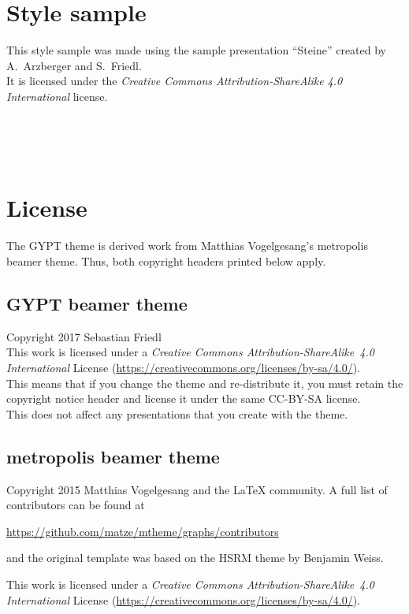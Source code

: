 \documentclass[12pt,a4paper]{scrartcl}
\begin{document}
	\section{Style sample}
	This style sample was made using the sample presentation \enquote{Steine} created by A.~Arzberger and S.~Friedl. \\
	It is licensed under the \textit{Creative Commons Attribution-ShareAlike 4.0 International} license.
	\begin{center}
		  \\
		  \\
		  \\
		 
	\end{center}

	
	\section{License}
	The GYPT theme is derived work from Matthias Vogelgesang's metropolis beamer theme. Thus, both copyright headers printed below apply.
	
	\subsection*{GYPT beamer theme}
	Copyright 2017 Sebastian Friedl \\
	This work is licensed under a \textit{Creative Commons Attribution-ShareAlike~4.0 International} License (\url{https://creativecommons.org/licenses/by-sa/4.0/}). \\
	This means that if you change the theme and re-distribute it, you must retain the copyright notice header and license it under the same CC-BY-SA license. \\
	This does not affect any presentations that you create with the theme.
	
	\subsection*{metropolis beamer theme}
	Copyright 2015 Matthias Vogelgesang and the LaTeX community. A full list of contributors can be found at
	\begin{center}
		\url{https://github.com/matze/mtheme/graphs/contributors}
	\end{center}
	and the original template was based on the HSRM theme by Benjamin Weiss.

	This work is licensed under a \textit{Creative Commons Attribution-ShareAlike~4.0 International} License (\url{https://creativecommons.org/licenses/by-sa/4.0/}).
\end{document}
